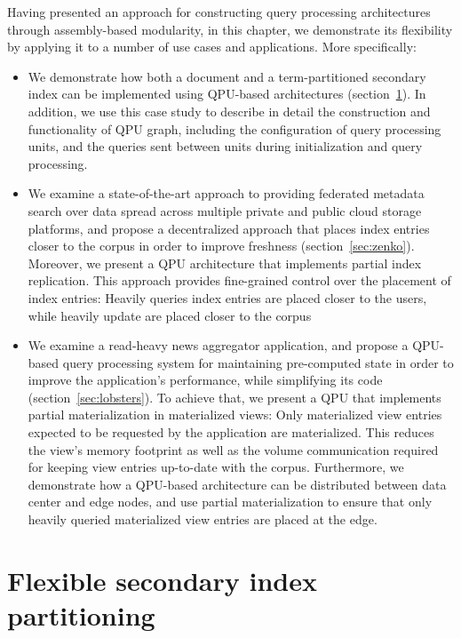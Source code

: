 Having presented an approach for constructing query processing architectures through assembly-based modularity,
in this chapter, we demonstrate its flexibility by applying it to a number of use cases and applications.
More specifically:

\begin{itemize}
  \item We demonstrate how both a document and a term-partitioned secondary
  index can be implemented using QPU-based architectures (section~\ref{sec:cs_index_partitioning}).
  In addition,
  we use this case study to describe in detail the construction and functionality of QPU graph,
  including the configuration of query processing units, and the queries sent between units
  during initialization and query processing.

  \item We examine a state-of-the-art approach to providing federated metadata search over data spread
  across multiple private and public cloud storage platforms,
  and propose a decentralized approach that places index entries closer to the corpus in order to improve
  freshness (section~\ref{sec:zenko}).
  Moreover, we present a QPU architecture that implements partial index replication.
  This approach provides fine-grained control over the placement of index entries:
  Heavily queries index entries are placed closer to the users,
  while heavily update are placed closer to the corpus

  \item We examine a read-heavy news aggregator application,
  and propose a QPU-based query processing system for maintaining pre-computed state in order to improve the application's performance,
  while simplifying its code (section~\ref{sec:lobsters}).
  To achieve that, we present a QPU that implements partial materialization in materialized views:
  Only materialized view entries expected to be requested by the application are materialized.
  This reduces the view's memory footprint as well as the volume communication required for keeping view entries up-to-date
  with the corpus.
  Furthermore, we demonstrate how a QPU-based architecture can be distributed between data center and edge nodes,
  and use partial materialization to ensure that only heavily queried materialized view entries are placed at the edge.
\end{itemize}

\section{Flexible secondary index partitioning}
\label{sec:cs_index_partitioning}

